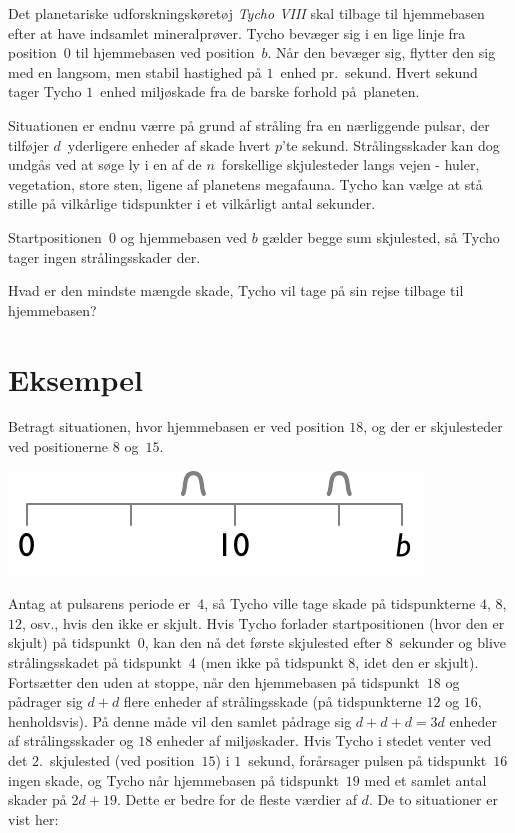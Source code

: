 

\noindent
Det planetariske udforsknings\-køretøj \emph{Tycho VIII} skal tilbage til hjemmebasen efter at have indsamlet mineralprøver.
Tycho bevæger sig i en lige linje fra position~$0$ til hjemmebasen ved position~$b$.
Når den bevæger sig, flytter den sig med en langsom, men stabil hastighed på $1$~enhed pr.\ sekund.
Hvert sekund tager Tycho $1$~enhed miljøskade fra de barske forhold på planeten.

Situationen er endnu værre på grund af stråling fra en nærliggende pulsar, der tilføjer $d$~yderligere enheder af skade hvert $p$'te sekund.
Strålingsskader kan dog undgås ved at søge ly i en af de $n$~forskellige skjulesteder langs vejen - huler, vegetation, store sten, ligene af planetens megafauna.
Tycho kan vælge at stå stille på vilkårlige tidspunkter i et vilkårligt antal sekunder.

Startpositionen~$0$ og hjemmebasen ved $b$ gælder begge sum skjulested, så Tycho tager ingen strålingsskader der.

\medskip
Hvad er den mindste mængde skade, Tycho vil tage på sin rejse tilbage til hjemmebasen?

\section*{Eksempel}

Betragt situationen, hvor hjemmebasen er ved position $18$, og der er skjulesteder ved positionerne $8$ og~$15$.

\includegraphics[width=.3\textwidth]{img/samplesetup}

Antag at pulsarens periode er~$4$, så Tycho ville tage skade på tidspunkterne $4$, $8$, $12$, osv., hvis den ikke er skjult.
Hvis Tycho forlader startpositionen (hvor den er skjult) på tidspunkt~$0$, kan den nå det første skjulested efter $8$~sekunder og blive strålingsskadet på tidspunkt~$4$ (men ikke på tidspunkt $8$, idet den er skjult).
Fortsætter den uden at stoppe, når den hjemmebasen på tidspunkt~$18$ og pådrager sig $d+d$ flere enheder af strålingsskade (på tidspunkterne $12$ og $16$, henholdsvis).
På denne måde vil den samlet pådrage sig $d+d+d=3d$ enheder af strålingsskader og $18$ enheder af miljøskader.
Hvis Tycho i stedet venter ved det $2$.~skjulested (ved position~$15$) i $1$~sekund, forårsager pulsen på tidspunkt~$16$ ingen skade, og Tycho når hjemmebasen på tidspunkt~$19$ med et samlet antal skader på $2d + 19$.
Dette er bedre for de fleste værdier af $d$.
De to situationer er vist her:

